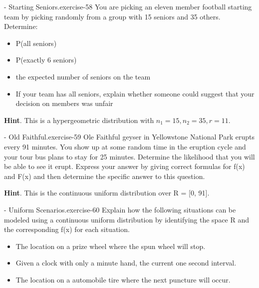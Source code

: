 \documentclass[10pt,]{book}
\numberwithin{equation}{section}
\begin{document}
%
\par
\hypertarget{p-871}{}%
\begin{inlineexercise}{- Starting Seniors.}{exercise-58}%
\hypertarget{p-872}{}%
You are picking an eleven member football starting team by picking randomly from a group with 15 seniors and 35 others. Determine: \leavevmode%
\begin{itemize}[label=\textbullet]
\item{}P(all seniors)%
\item{}P(exactly 6 seniors)%
\item{}the expected number of seniors on the team%
\item{}If your team has all seniors, explain whether someone could suggest that your decision on members was unfair%
\end{itemize}
%
\par\smallskip%
\noindent\textbf{Hint}.\hypertarget{hint-5}{}\quad%
\hypertarget{p-873}{}%
This is a hypergeometric distribution with \(n_1 = 15, n_2 = 35, r = 11\).%
\end{inlineexercise}
%
\par
\hypertarget{p-874}{}%
\begin{inlineexercise}{- Old Faithful.}{exercise-59}%
\hypertarget{p-875}{}%
Ole Faithful geyser in Yellowstone National Park erupts every 91 minutes. You show up at some random time in the eruption cycle and your tour bus plans to stay for 25 minutes. Determine the likelihood that you will be able to see it erupt.  Express your answer by giving correct formulas for f(x) and F(x) and then determine the specific answer to this question.%
\par\smallskip%
\noindent\textbf{Hint}.\hypertarget{hint-6}{}\quad%
\hypertarget{p-876}{}%
This is the continuous uniform distribution over R = [0, 91].%
\end{inlineexercise}
%
\par
\hypertarget{p-877}{}%
\begin{inlineexercise}{- Uniform Scenarios.}{exercise-60}%
\hypertarget{p-878}{}%
Explain how the following situations can be modeled using a continuous uniform distribution by identifying the space R and the corresponding f(x) for each situation. \leavevmode%
\begin{itemize}[label=\textbullet]
\item{}The location on a prize wheel where the spun wheel will stop.%
\item{}Given a clock with only a minute hand, the current one second interval.%
\item{}The location on a automobile tire where the next puncture will occur.%
\end{itemize}
%
\end{inlineexercise}
\end{document}
